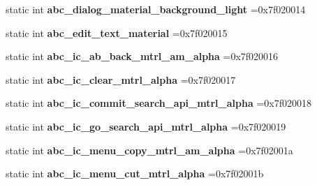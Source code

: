 \begin{DoxyCompactItemize}
static int {\bfseries abc\+\_\+dialog\+\_\+material\+\_\+background\+\_\+light} =0x7f020014
\item 
\mbox{\label{classandroid_1_1support_1_1v7_1_1appcompat_1_1R_1_1drawable_aecbc2067c07e1800dd66eaf370448f0a}} 
static int {\bfseries abc\+\_\+edit\+\_\+text\+\_\+material} =0x7f020015
\item 
\mbox{\label{classandroid_1_1support_1_1v7_1_1appcompat_1_1R_1_1drawable_a1ac0dc8e24d90acaf4e8c851e791b550}} 
static int {\bfseries abc\+\_\+ic\+\_\+ab\+\_\+back\+\_\+mtrl\+\_\+am\+\_\+alpha} =0x7f020016
\item 
\mbox{\label{classandroid_1_1support_1_1v7_1_1appcompat_1_1R_1_1drawable_a00862370cff6b23f1dccd7835949501a}} 
static int {\bfseries abc\+\_\+ic\+\_\+clear\+\_\+mtrl\+\_\+alpha} =0x7f020017
\item 
\mbox{\label{classandroid_1_1support_1_1v7_1_1appcompat_1_1R_1_1drawable_ac21a0d3125a6091f10531a2fec125c74}} 
static int {\bfseries abc\+\_\+ic\+\_\+commit\+\_\+search\+\_\+api\+\_\+mtrl\+\_\+alpha} =0x7f020018
\item 
\mbox{\label{classandroid_1_1support_1_1v7_1_1appcompat_1_1R_1_1drawable_aba894068a60b0e4ee71c46f00347f637}} 
static int {\bfseries abc\+\_\+ic\+\_\+go\+\_\+search\+\_\+api\+\_\+mtrl\+\_\+alpha} =0x7f020019
\item 
\mbox{\label{classandroid_1_1support_1_1v7_1_1appcompat_1_1R_1_1drawable_ac1629ca09cb1ef6e397f41394c8c41fb}} 
static int {\bfseries abc\+\_\+ic\+\_\+menu\+\_\+copy\+\_\+mtrl\+\_\+am\+\_\+alpha} =0x7f02001a
\item 
\mbox{\label{classandroid_1_1support_1_1v7_1_1appcompat_1_1R_1_1drawable_a0b7fbfb9d85e64590fbf7c504e4d1c0c}} 
static int {\bfseries abc\+\_\+ic\+\_\+menu\+\_\+cut\+\_\+mtrl\+\_\+alpha} =0x7f02001b
\item 

\end{DoxyCompactItemize}
